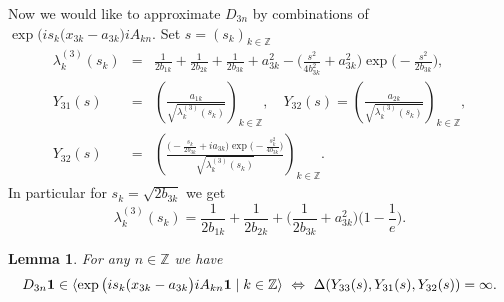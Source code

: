\documentclass[preprint,12pt]{elsarticle}
\newtheorem{lem}[thm]{Lemma}
\numberwithin{equation}{section}
\begin{document}
{\small
Now we would like to approximate $D_{3n}$ by combinations of $\exp\big(is_k(x_{3k}-a_{3k}\big)iA_{kn}$. Set $s=(s_k)_{k\in \mathbb Z}$
\begin{eqnarray}
\label{lambda(3)(s)}
\lambda_k^{(3)}(s_k)&=&\frac{1}{2b_{1k}}+\frac{1}{2b_{2k}}+\frac{1}{2b_{3k}}+a_{3k}^2-
\Big(\frac{s^2}{4b^2_{3k}}+a_{3k}^2\Big)\exp\big(-
\frac{s^2}{2b_{3k}}\big),\\
\label{Y_3(s)}
Y_{31}(s)&=&\left(
\frac{a_{1k}}{\sqrt{\lambda_k^{(3)}(s_k)}}\right)_{k\in \mathbb Z},\quad
Y_{32}(s)=\left(
\frac{a_{2k}}{\sqrt{\lambda_k^{(3)}(s_k)}}\right)_{k\in \mathbb Z},\\
\nonumber
Y_{32}(s)&=&\left(
\frac{\Big(-\frac{s_k}{2b_{3k}}+ia_{3k}\Big)\exp\big(-\frac{s_k^2}{4b_{3k}}\big)}{\sqrt{\lambda_k^{(3)}(s_k)}}\right)_{k\in \mathbb Z}.
\end{eqnarray}
In particular for $s_k=\sqrt{2b_{3k}}$ we get
\begin{equation}
\label{lambda(3)(s).min}
\lambda_k^{(3)}(s_k)=\frac{1}{2b_{1k}}+\frac{1}{2b_{2k}}+
\Big(\frac{1}{2b_{3k}}+a_{3k}^2\Big)\big(1-\frac{1}{e}
\big).
\end{equation}
}
\begin{lem}
\label{exp(x)A3}
For any  $n\in {\mathbb Z}$ we have
$$
D_{3n}{\bf 1}\in\langle \exp\big(is_k(x_{3k}-a_{3k}\big)iA_{kn}{\bf 1}\mid k\in {\mathbb Z}\rangle
\,\,\Leftrightarrow\,\, 
\Delta(Y_{33}(s),Y_{31}(s),Y_{32}(s))=\infty.
$$
\end{lem}
\end{document}
